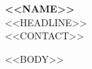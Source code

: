 \documentclass[10pt,a4paper]{article}
\begin{document}
\small
\begin{center}
  {\Huge\bfseries <<NAME>>}\\[3pt]
  {\large\textcolor{dark-grey}{<<HEADLINE>>}}\\[6pt]
  \small <<CONTACT>>
\end{center}

<<BODY>>
\end{document}
